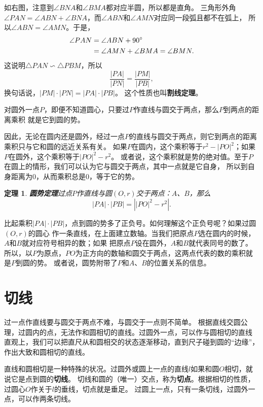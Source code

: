 \documentclass[12pt,UTF8]{ctexbook}
\newtheorem{tm}{定理}[section]
\begin{document}
如右图，注意到$\angle BNA$和$\angle BMA$都对应半圆，所以都是直角。
三角形外角$\angle PAN = \angle ABN + \angle BNA$，而$\angle ABN$和$\angle AMN$对应同一段弧且都不在弧上，
所以$\angle ABN = \angle AMN$。于是，
\begin{align}
    \angle PAN &= \angle ABN + 90^\circ \notag \\
    &= \angle AMN + \angle BMA =\angle BMN. \notag
\end{align}
这说明$\triangle PAN \backsim \triangle PBM$，所以
$$ \frac{|PA|}{|PN|} = \frac{|PM|}{|PB|},$$
换句话说，$|PM|\cdot |PN| = |PA|\cdot |PB|$。
这个性质也叫\textbf{割线定理}。

对圆外一点$P$，即便不知道圆心，只要过$P$作直线与圆交于两点，那么$P$到两点的距离乘积
就是它到圆的势。

因此，无论在圆内还是圆外，经过一点$P$的直线与圆交于两点，则它到两点的距离乘积只与它和圆的远近关系有关。
如果$P$在圆内，这个乘积等于$r^2 - |PO|^2$；如果$P$在圆外，这个乘积等于$|PO|^2 - r^2$。
或者说，这个乘积就是势的绝对值。至于$P$在圆上的情形，我们可以认为它与圆交于两点，其中一点就是它自身，
所以到自身距离为$0$，从而乘积总是$0$，等于它的势。

\begin{tm}\textbf{圆势定理}\label{tm:0-3-40}
    过点$P$作直线与圆$(O, r)$交于两点：$A$、$B$，那么
    $$ |PA| \cdot |PB| = \left||PO|^2 - r^2\right|. $$
\end{tm}

比起乘积$|PA| \cdot |PB|$，点到圆的势多了正负号。如何理解这个正负号呢？如果过圆$(O,r)$的圆心
作一条直线，在上面建立数轴。当我们把原点$P$选在圆内的时候，$A$和$B$就对应符号相异的数；如果
把原点$P$设在圆外，$A$和$B$就代表同号的数了。
所以，以$P$为原点，$PO$为正方向的数轴和圆交于两点，这两点代表的数的乘积就是$P$到圆的势。
或者说，圆势附带了$P$和$A$、$B$的位置关系的信息。


\section{切线}
过一点作直线要与圆交于两点不难，与圆交于一点则不简单。
根据直线交圆公理，过圆内的点，无法作和圆相切的直线。过圆外一点，可以作与圆相切的直线
直观上，我们可以把直尺从和圆相交的状态逐渐移动，直到尺子碰到圆的“边缘”，作出大致和圆相切的直线。

直线和圆相切是一种特殊的状况。过圆外或圆上一点的直线$l$如果和圆$O$相切，就说它是点到圆的\textbf{切线}。
切线和圆的（唯一）交点，称为\textbf{切点}。根据相切的性质，过圆心$O$作关于$l$的垂线，切点就是垂足。
过圆上一点，只有一条切线，过圆外一点，可以作两条切线。
\end{document}

